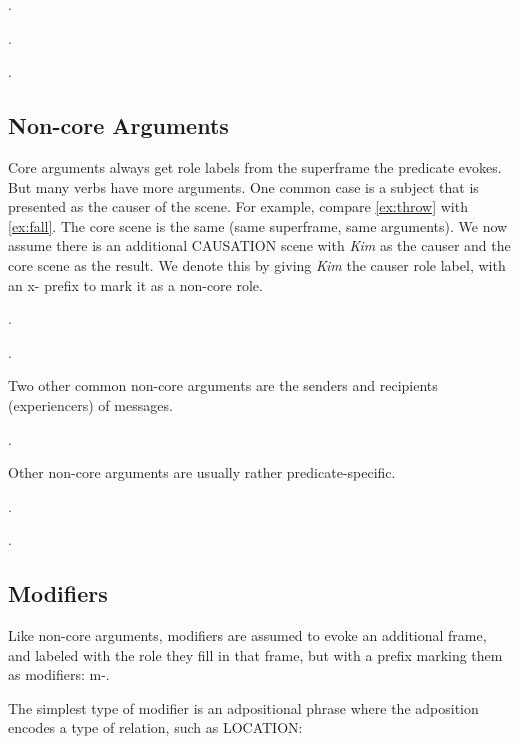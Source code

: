 \documentclass[a4paper]{article}
\newcommand{\fr}[1]{\textsf{#1}}
\newcommand{\rl}[1]{\textsf{#1}}
\begin{document}
\ex.

\ex.

\ex.


\newpage\subsection{Non-core Arguments}

Core arguments always get role labels from the superframe the predicate evokes.
But many verbs have more arguments. One common case is a subject that is
presented as the causer of the scene. For example, compare \ref{ex:throw} with
\ref{ex:fall}. The core scene is the same (same superframe, same arguments). We
now assume there is an additional \fr{CAUSATION} scene with \emph{Kim} as the
\rl{causer} and the core scene as the \rl{result}. We denote this by giving
\emph{Kim} the \rl{causer} role label, with an \rl{x-} prefix to mark it as a
non-core role.

\ex.\label{ex:throw}

\ex.

Two other common non-core arguments are the senders and recipients (experiencers) of messages.

\ex.

Other non-core arguments are usually rather predicate-specific.

\ex.

\ex.


\newpage\subsection{Modifiers}
\label{sec:modifiers}

Like non-core arguments, modifiers are assumed to evoke an additional frame,
and labeled with the role they fill in that frame, but with a prefix marking
them as modifiers: \rl{m-}.

The simplest type of modifier is an adpositional phrase where the adposition
encodes a type of relation, such as \fr{LOCATION}:
\end{document}
